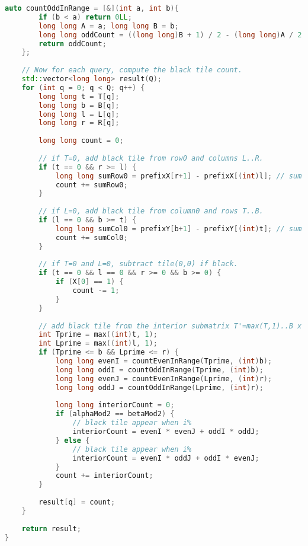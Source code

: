 \begin{lstlisting}[language=C++]
    auto countOddInRange = [&](int a, int b){
        if (b < a) return 0LL;
        long long A = a; long long B = b;
        long long oddCount = ((long long)B + 1) / 2 - (long long)A / 2;
        return oddCount;
    };
 
    // Now for each query, compute the black tile count.
    std::vector<long long> result(Q);
    for (int q = 0; q < Q; q++) {
        long long t = T[q];
        long long b = B[q];
        long long l = L[q];
        long long r = R[q];
 
        long long count = 0;
 
        // if T=0, add black tile from row0 and columns L..R.
        if (t == 0 && r >= l) {
            long long sumRow0 = prefixX[r+1] - prefixX[(int)l]; // sum of X[L..R]
            count += sumRow0;
        }
 
        // if L=0, add black tile from column0 and rows T..B.
        if (l == 0 && b >= t) {
            long long sumCol0 = prefixY[b+1] - prefixY[(int)t]; // sum of Y[T..B]
            count += sumCol0;
        }
 
        // if T=0 and L=0, subtract tile(0,0) if black.
        if (t == 0 && l == 0 && r >= 0 && b >= 0) {
            if (X[0] == 1) {
                count -= 1;
            }
        }
 
        // add black tile from the interior submatrix T'=max(T,1)..B x L'=max(L,1)..R.
        int Tprime = max((int)t, 1);
        int Lprime = max((int)l, 1);
        if (Tprime <= b && Lprime <= r) {
            long long evenI = countEvenInRange(Tprime, (int)b);
            long long oddI = countOddInRange(Tprime, (int)b);
            long long evenJ = countEvenInRange(Lprime, (int)r);
            long long oddJ = countOddInRange(Lprime, (int)r);
 
            long long interiorCount = 0;
            if (alphaMod2 == betaMod2) {
                // black tile appear when i%
                interiorCount = evenI * evenJ + oddI * oddJ;
            } else {
                // black tile appear when i%
                interiorCount = evenI * oddJ + oddI * evenJ;
            }
            count += interiorCount;
        }
 
        result[q] = count;
    }
 
    return result;
}
\end{lstlisting}
